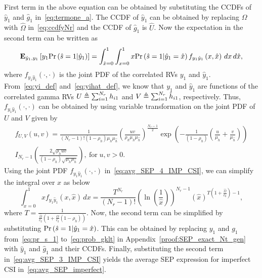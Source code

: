 \documentclass[12pt,draftcls,peerreview,onecolumn]{IEEEtran}
\newcommand{\brac}[1]{\left({#1}\right)}
\newcommand{\define}{\triangleq}
\newcommand{\explow}[2]{{\bf{E}}_{#1}\left[{#2}\right]}
\newcommand{\prob}[1]{\text{Pr}\brac{#1}}
\newcommand{\given}{\arrowvert}
\newcommand{\muh}{{\mu_{h}}}
\newcommand{\Nr}{{N_r}}
\newcommand{\such}{h}
\newcommand{\puch}{g}
\newcommand{\hk}[1]{{\such_{#1}}}
\newcommand{\gk}[1]{{\puch_{#1}}}
\newcommand{\ctwo}{c_{2}}
\newcommand{\yk}[1]{y_{#1}}
\newcommand{\al}{\ctwo}
\newcommand{\snr}{\Omega}
\newcommand{\snrbyal}[1][]{\frac{\snr#1}{\al}}
\newcommand{\un}{U}
\newcommand{\unhat}{\widehat{\un}}
\newcommand{\snrhat}{\widehat{\snr}}
\newcommand{\hhat}{\hat{\such}}
\newcommand{\ghat}{\hat{\puch}}
\newcommand{\shat}{\hat{s}}
\newcommand{\hkhat}[1]{\hhat_{#1}}
\newcommand{\gkhat}[1]{\ghat_{#1}}
\newcommand{\ykhat}[1]{\hat{y}_{#1}}
\newcommand{\muhhat}{\mu_{\hhat}}
\newcommand{\snrhatbyal}[1][]{\frac{\snrhat#1}{\al}}
\newcommand{\rhoh}{\rho_h}
\newcommand{\Tc}{\frac{1}{\snrhatbyal\left(1 + \snrbyal\left(1 - \rhoh \right)  \right) }}
\newcommand{\T}{T}
\begin{document}
First term in the above equation can be obtained by substituting the CCDFs of $\ykhat{1}$ and $\gkhat{1}$ in~\eqref{eq:termone_a}. The CCDF of $\ykhat{1}$ can be obtained by replacing $\snr$ with $\snrhat$ in~\eqref{eq:ccdfyNr} and the CCDF of $\gkhat{1}$ is $\unhat$. Now the expectation in the second term can be written as 
%
\newcommand{\Xhat}{\widehat{X}}
\newcommand{\xhat}{\hat{x}}
\begin{equation}
\label{eq:avg_SEP_4_IMP_CSI}
\explow{\ykhat{1},\yk{1}}{\yk{1}\prob{\shat=1\given \ykhat{1}}}= \int_{\xhat=0}^{1} \int_{x=0}^{1} x \prob{\shat=1\given \ykhat{1}=\xhat}  f_{\yk{1}\ykhat{1}}\left(x,\xhat\right)\,dx\,d\xhat,
\end{equation}
%
where $f_{\yk{1}\ykhat{1}}\left(\cdot,\cdot\right)$ is the joint PDF of the correlated RVs $\yk{1}$ and $\ykhat{1}$. From~\eqref{eq:yi_def} and~\eqref{eq:yihat_def}, we know that $\yk{1}$ and $\ykhat{1}$ are functions of the correlated gamma RVs $U\define\sumnr\hk{i1}$ and $V\define\sumnr\hkhat{i1}$, respectively. Thus, $f_{\yk{1}\ykhat{1}}\left(\cdot,\cdot\right)$ can be obtained by using variable transformation on the joint PDF of $U$ and $V$ given by 
%
\begin{multline}
\label{eq:bivargammaPDF}
f_{U,V}(u,v) = \frac{1}{(\Nr-1)!\left(1-\rhoh \right)\muh\muhhat }\left(\frac{uv}{\rhoh \muh\muhhat}\right)^{\frac{\Nr-1}{2}}\exp\left({-\frac{1}{(1-\rhoh)}\left( \frac{u}{\muh}+\frac{ v}{\muhhat}\right) } \right) \\ I_{\Nr-1}\left(\frac{2\sqrt{\rhoh uv}}{(1-\rhoh)\sqrt{\muh\muhhat}}\right),~\text{for}\; u,v>0.
\end{multline}
%
Using the joint PDF  $f_{\yk{1}\ykhat{1}}\left(\cdot,\cdot\right)$ in~\eqref{eq:avg_SEP_4_IMP_CSI}, we can simplify the integral over $x$ as below  
\begin{equation}
\label{eq:y1_jpdf}
\int_{x=0}^{1} x f_{\yk{1}\ykhat{1}}\left(x,\xhat\right)\,dx = \frac{T^{\Nr}}{(\Nr-1)!} \left(\ln\left(\frac{1}{\xhat} \right)\right)^{\Nr-1} \left(\xhat\right)^{\T\left(1 + \snrhatbyal \right) -1 },
\end{equation}
where $\T=\Tc$. Now, the second term can be simplified by substituting $\prob{\shat=1\given\ykhat{1}=\xhat}$. This can be obtained by replacing $\yk{1}$ and $\gk{1}$ from~\eqref{eq:pr_s_1} to~\eqref{eq:prob_gklt} in Appendix~\ref{proof:SEP_exact_Nt_gen} with $\ykhat{1}$ and $\gkhat{1}$ and their CCDFs. Finally, substituting the second term in~\eqref{eq:avg_SEP_3_IMP_CSI} yields the average SEP expression for imperfect CSI  in~\eqref{eq:avg_SEP_imperfect}.
\end{document}
